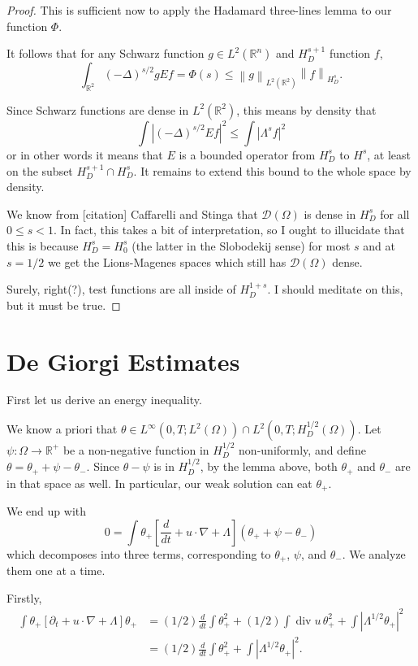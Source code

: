 \documentclass[11pt]{amsart}
\theoremstyle{remark}
\newcommand{\R}{\mathbb{R}}
\newcommand{\norm}[1]{\left\lVert#1\right\rVert}
\newcommand{\paren}[1]{\left( #1 \right)}
\newcommand{\bracket}[1]{\left[ #1 \right]}
\newcommand{\abs}[1]{\left\lvert #1 \right\rvert}
\newcommand{\del}{\partial}
\newcommand{\grad}{\nabla}
\newcommand{\ddt}{\frac{d}{dt}}
\renewcommand{\div}{\operatorname{div}}
\newcommand{\Laplace}{\Delta}
\newcommand{\test}{\mathcal{D}}
\begin{document}
\begin{proof}
This is sufficient now to apply the Hadamard three-lines lemma to our function $\Phi$.  

It follows that for any Schwarz function $g \in L^2(\R^n)$ and $H_D^{s+1}$ function $f$, 
\[ \int_{\R^2} \paren{-\Laplace}^{s/2} g E f = \Phi(s) \leq \norm{g}_{L^2(\R^2)} \norm{f}_{H_D^s}. \]

Since Schwarz functions are dense in $L^2(\R^2)$, this means by density that 
\[ \int \abs{ \paren{-\Laplace}^{s/2} E f }^2 \leq \int \abs{\Lambda^s f}^2 \]
or in other words it means that $E$ is a bounded operator from $H_D^s$ to $H^s$, at least on the subset $H_D^{s+1} \cap H_D^s$.  It remains to extend this bound to the whole space by density.  

We know from [citation] Caffarelli and Stinga that $\test(\Omega)$ is dense in $H_D^s$ for all $0 \leq s < 1$.  In fact, this takes a bit of interpretation, so I ought to illucidate that this is because $H_D^s = H_0^s$ (the latter in the Slobodekij sense) for most $s$ and at $s=1/2$ we get the Lions-Magenes spaces which still has $\test(\Omega)$ dense.  

Surely, right(?), test functions are all inside of $H_D^{1+s}$.  I should meditate on this, but it must be true.  
\end{proof}


\section{De Giorgi Estimates}

First let us derive an energy inequality.  

We know a priori that $\theta \in L^\infty(0,T; L^2(\Omega)) \cap L^2(0,T; H_D^{1/2}(\Omega))$.  Let $\psi: \Omega \to \R^+$ be a non-negative function in $H_D^{1/2}$ non-uniformly, and define $\theta = \theta_+ + \psi - \theta_-$.  Since $\theta - \psi$ is in $H_D^{1/2}$, by the lemma above, both $\theta_+$ and $\theta_-$ are in that space as well.  In particular, our weak solution can eat $\theta_+$.  

We end up with
\[ 0 = \int \theta_+ \bracket{ \ddt + u \cdot \grad + \Lambda } \paren{\theta_+ + \psi - \theta_-} \]
which decomposes into three terms, corresponding to $\theta_+$, $\psi$, and $\theta_-$.  We analyze them one at a time.  

Firstly,
\begin{align*} 
\int \theta_+ \bracket{ \del_t + u \cdot \grad + \Lambda } \theta_+ &= (1/2) \ddt \int \theta_+^2 + (1/2) \int \div u \, \theta_+^2 + \int \abs{\Lambda^{1/2} \theta_+}^2
\\ &= (1/2) \ddt \int \theta_+^2 + \int \abs{\Lambda^{1/2} \theta_+}^2.
\end{align*}
\end{document}
